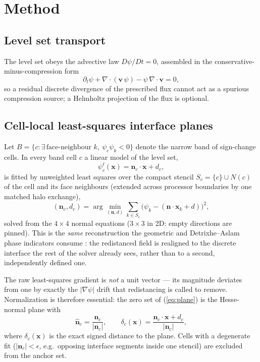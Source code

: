 \documentclass[preprint,3p,11pt]{elsarticle}
\newcommand{\psilev}{\psi}
\newcommand{\nhat}{\hat{\mathbf{n}}}
\newcommand{\gradpsi}{\nabla\psilev}
\begin{document}
\section{Method}
\label{sec:method}

\subsection{Level set transport}
The level set obeys the advective law $D\psilev/Dt = 0$, assembled in the
conservative-minus-compression form
\begin{equation}
  \partial_t \psilev + \nabla\cdot(\mathbf{v}\,\psilev)
  - \psilev\,\nabla\cdot\mathbf{v} = 0,
  \label{eq:psi}
\end{equation}
so a residual discrete divergence of the prescribed flux cannot act as a
spurious compression source; a Helmholtz projection of the flux is optional.

\subsection{Cell-local least-squares interface planes}
\label{sec:llsplanes}
Let $B = \{c : \exists\, \text{face-neighbour } k,\ \psilev_c\psilev_k < 0\}$
denote the narrow band of sign-change cells. In every band cell $c$ a linear
model of the level set,
\begin{equation}
  \psilev^{\ell}_c(\mathbf{x}) = \mathbf{n}_c\cdot\mathbf{x} + d_c,
  \label{eq:plane}
\end{equation}
is fitted by unweighted least squares over the compact stencil
$S_c = \{c\}\cup N(c)$ of the cell and its face neighbours (extended across
processor boundaries by one matched halo exchange),
\begin{equation}
  (\mathbf{n}_c, d_c)
  = \arg\min_{(\mathbf{n},d)} \sum_{k \in S_c}
    \big(\psilev_k - (\mathbf{n}\cdot\mathbf{x}_k + d)\big)^2 ,
  \label{eq:lls}
\end{equation}
solved from the $4\times4$ normal equations ($3\times3$ in 2D: empty
directions are pinned). This is the \emph{same} reconstruction the
geometric and Detrixhe--Aslam phase indicators consume \cite{detrixhe2016}:
the redistanced field is realigned to the discrete interface the rest of
the solver already sees, rather than to a second, independently defined one.

The raw least-squares gradient is \emph{not} a unit vector --- its magnitude
deviates from one by exactly the $|\gradpsi|$ drift that redistancing is
called to remove. Normalization is therefore essential: the zero set of
(\ref{eq:plane}) is the Hesse-normal plane with
\begin{equation}
  \nhat_c = \frac{\mathbf{n}_c}{|\mathbf{n}_c|},
  \qquad
  \delta_c(\mathbf{x}) = \frac{\mathbf{n}_c\cdot\mathbf{x} + d_c}{|\mathbf{n}_c|},
  \label{eq:hesse}
\end{equation}
where $\delta_c(\mathbf{x})$ is the exact signed distance to the plane.
Cells with a degenerate fit ($|\mathbf{n}_c| < \epsilon$, e.g.\ opposing
interface segments inside one stencil) are excluded from the anchor set.
\end{document}
